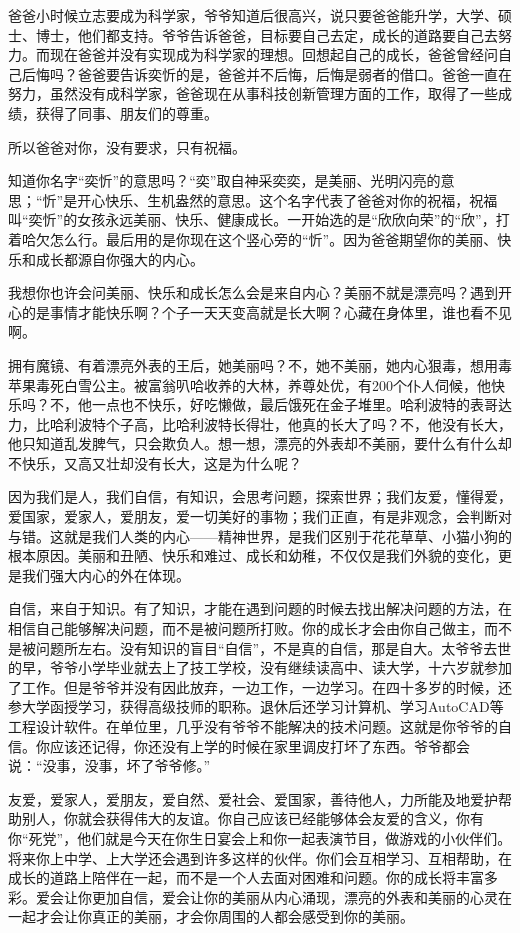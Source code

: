 爸爸小时候立志要成为科学家，爷爷知道后很高兴，说只要爸爸能升学，大学、硕士、博士，他们都支持。爷爷告诉爸爸，目标要自己去定，成长的道路要自己去努力。而现在爸爸并没有实现成为科学家的理想。回想起自己的成长，爸爸曾经问自己后悔吗？爸爸要告诉奕忻的是，爸爸并不后悔，后悔是弱者的借口。爸爸一直在努力，虽然没有成科学家，爸爸现在从事科技创新管理方面的工作，取得了一些成绩，获得了同事、朋友们的尊重。

所以爸爸对你，没有要求，只有祝福。

知道你名字“奕忻”的意思吗？“奕”取自神采奕奕，是美丽、光明闪亮的意思；“忻”是开心快乐、生机盎然的意思。这个名字代表了爸爸对你的祝福，祝福叫“奕忻”的女孩永远美丽、快乐、健康成长。一开始选的是“欣欣向荣”的“欣”，打着哈欠怎么行。最后用的是你现在这个竖心旁的“忻”。因为爸爸期望你的美丽、快乐和成长都源自你强大的内心。

我想你也许会问美丽、快乐和成长怎么会是来自内心？美丽不就是漂亮吗？遇到开心的是事情才能快乐啊？个子一天天变高就是长大啊？心藏在身体里，谁也看不见啊。

拥有魔镜、有着漂亮外表的王后，她美丽吗？不，她不美丽，她内心狠毒，想用毒苹果毒死白雪公主。被富翁叭哈收养的大林，养尊处优，有200个仆人伺候，他快乐吗？不，他一点也不快乐，好吃懒做，最后饿死在金子堆里。哈利波特的表哥达力，比哈利波特个子高，比哈利波特长得壮，他真的长大了吗？不，他没有长大，他只知道乱发脾气，只会欺负人。想一想，漂亮的外表却不美丽，要什么有什么却不快乐，又高又壮却没有长大，这是为什么呢？

因为我们是人，我们自信，有知识，会思考问题，探索世界；我们友爱，懂得爱，爱国家，爱家人，爱朋友，爱一切美好的事物；我们正直，有是非观念，会判断对与错。这就是我们人类的内心——精神世界，是我们区别于花花草草、小猫小狗的根本原因。美丽和丑陋、快乐和难过、成长和幼稚，不仅仅是我们外貌的变化，更是我们强大内心的外在体现。

自信，来自于知识。有了知识，才能在遇到问题的时候去找出解决问题的方法，在相信自己能够解决问题，而不是被问题所打败。你的成长才会由你自己做主，而不是被问题所左右。没有知识的盲目“自信”，不是真的自信，那是自大。太爷爷去世的早，爷爷小学毕业就去上了技工学校，没有继续读高中、读大学，十六岁就参加了工作。但是爷爷并没有因此放弃，一边工作，一边学习。在四十多岁的时候，还参大学函授学习，获得高级技师的职称。退休后还学习计算机、学习AutoCAD等工程设计软件。在单位里，几乎没有爷爷不能解决的技术问题。这就是你爷爷的自信。你应该还记得，你还没有上学的时候在家里调皮打坏了东西。爷爷都会说：“没事，没事，坏了爷爷修。” 

友爱，爱家人，爱朋友，爱自然、爱社会、爱国家，善待他人，力所能及地爱护帮助别人，你就会获得伟大的友谊。你自己应该已经能够体会友爱的含义，你有你“死党”，他们就是今天在你生日宴会上和你一起表演节目，做游戏的小伙伴们。将来你上中学、上大学还会遇到许多这样的伙伴。你们会互相学习、互相帮助，在成长的道路上陪伴在一起，而不是一个人去面对困难和问题。你的成长将丰富多彩。爱会让你更加自信，爱会让你的美丽从内心涌现，漂亮的外表和美丽的心灵在一起才会让你真正的美丽，才会你周围的人都会感受到你的美丽。

